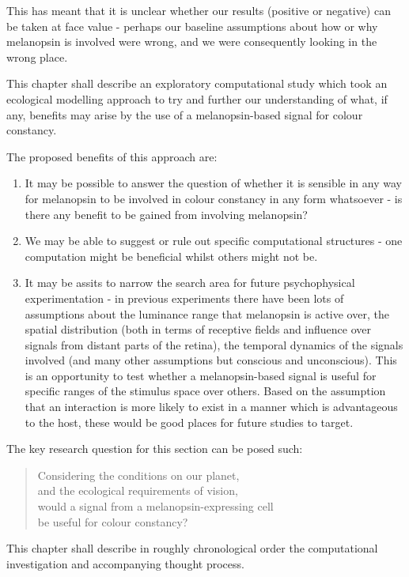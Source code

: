 This has meant that it is unclear whether our results (positive or negative) can be taken at face value - perhaps our baseline assumptions about how or why melanopsin is involved were wrong, and we were consequently looking in the wrong place.

This chapter shall describe an exploratory computational study which took an ecological modelling approach to try and further our understanding of what, if any, benefits may arise by the use of a melanopsin-based signal for colour constancy.

\noindent The proposed benefits of this approach are: 
\begin{enumerate}
    \item It may be possible to answer the question of whether it is sensible in any way for melanopsin to be involved in colour constancy in any form whatsoever - is there any benefit to be gained from involving melanopsin?
    \item We may be able to suggest or rule out specific computational structures - one computation might be beneficial whilst others might not be.
    \item It may be assits to narrow the search area for future psychophysical experimentation - in previous experiments there have been lots of assumptions about the luminance range that melanopsin is active over, the spatial distribution (both in terms of receptive fields and influence over signals from distant parts of the retina), the temporal dynamics of the signals involved (and many other assumptions but conscious and unconscious). This is an opportunity to test whether a melanopsin-based signal is useful for specific ranges of the stimulus space over others. Based on the assumption that an interaction is more likely to exist in a manner which is advantageous to the host, these would be good places for future studies to target.
\end{enumerate}

\noindent The key research question for this section can be posed such:

\begin{quote}
\centering 
Considering the conditions on our planet, \\
and the ecological requirements of vision, \\
would a signal from a melanopsin-expressing cell \\
be useful for colour constancy?
\end{quote}

This chapter shall describe in roughly chronological order the computational investigation and accompanying thought process.

